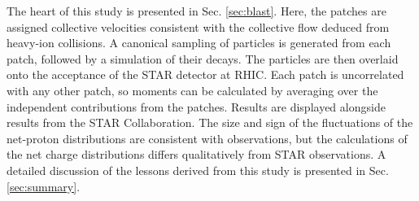The heart of this study is presented in Sec. \ref{sec:blast}. Here, the patches are assigned collective velocities consistent with the collective flow deduced from heavy-ion collisions. A canonical sampling of particles is generated from each patch, followed by a simulation of their decays. The particles are then overlaid onto the acceptance of the STAR detector at RHIC. Each patch is uncorrelated with any other patch, so moments can be calculated by averaging over the independent contributions from the patches. Results are displayed alongside results from the STAR Collaboration. The size and sign of the fluctuations of the net-proton distributions are consistent with observations, but the calculations of the net charge distributions differs qualitatively from STAR observations. A detailed discussion of the lessons derived from this study is presented in Sec. \ref{sec:summary}.
